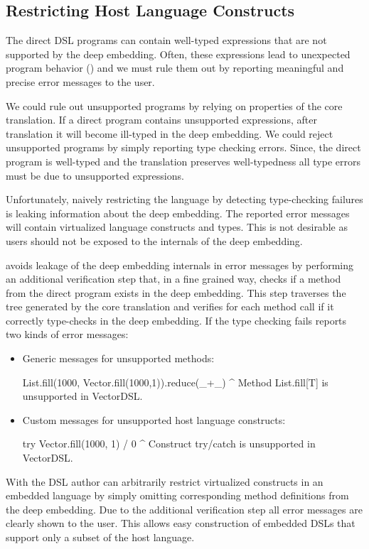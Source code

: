 \subsection{Restricting Host Language Constructs}
\label{sec:restricting}

The direct DSL programs can contain well-typed expressions that are not
supported by the deep embedding. Often, these expressions lead to unexpected program
behavior () and we must rule them out by reporting meaningful and
precise error messages to the user.

We could rule out unsupported programs by relying on properties of the
core translation. If a direct program contains unsupported expressions, after
translation it will become ill-typed in the deep embedding. We could reject
unsupported programs by simply reporting type checking errors. Since, the
direct program is well-typed and the translation preserves well-typedness all
type errors must be due to unsupported expressions.

Unfortunately, naively restricting the language by detecting type-checking
failures is leaking information about the deep embedding. The reported error
messages will contain virtualized language constructs and types. This is not desirable
as users should not be exposed to the internals of the deep embedding.

\yy avoids leakage of the deep embedding internals in error messages by performing an
additional verification step that, in a fine grained way, checks if a method
from the direct program exists in the deep embedding. This step traverses the
tree generated by the core translation and verifies for each method call if it
correctly type-checks in the deep embedding. If the type checking fails \yy
reports two kinds of error messages:

\begin{itemize}
\item Generic messages for unsupported methods:\begin{lstparagraph}
List.fill(1000, Vector.fill(1000,1)).reduce(_+_)
^
Method List.fill[T] is unsupported in VectorDSL.
\end{lstparagraph}

\item Custom messages for unsupported host language constructs:\begin{lstparagraph}
try Vector.fill(1000, 1) / 0
^
Construct try/catch is unsupported in VectorDSL.
\end{lstparagraph}
\end{itemize}
%
With \yy the DSL author can arbitrarily restrict virtualized constructs in an
embedded language by simply omitting corresponding method definitions from the
deep embedding. Due to the additional verification step all error messages are
clearly shown to the user. This allows easy construction of embedded DSLs that
support only a subset of the host language.

